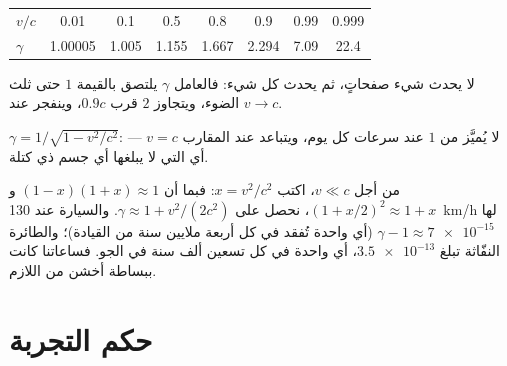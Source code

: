 \begin{example}\label{ex:g12:special-relativity:gammatable}
\begin{center}\small
\begin{tabular}{lccccccc}
$v/c$    & 0.01     & 0.1   & 0.5   & 0.8   & 0.9   & 0.99 & 0.999\\
$\gamma$ & 1.00005 & 1.005 & 1.155 & 1.667 & 2.294 & 7.09 & 22.4
\end{tabular}
\end{center}
لا يحدث شيء صفحاتٍ، ثم يحدث كل شيء: فالعامل $\gamma$ يلتصق بالقيمة $1$ حتى ثلث
 الضوء، ويتجاوز $2$ قرب $0.9c$، وينفجر عند $v \to c$.
\end{example}

\begin{omfigure}

{\small $\gamma = 1/\sqrt{1 - v^2/c^2}$: لا يُميَّز من $1$ عند سرعات
كل يوم، ويتباعد عند المقارب $v = c$ --- أي  التي لا يبلغها أي جسم ذي كتلة.}
\end{omfigure}

\begin{remark}\label{rem:g12:special-relativity:everyday}
من أجل $v \ll c$، اكتب $x = v^2/c^2$: فبما أن $(1-x)(1+x) \approx 1$ و
$(1 + x/2)^2 \approx 1 + x$، نحصل على $\gamma \approx 1 + v^2/(2c^2)$. والسيارة
عند \qty{130}{km/h} لها $\gamma - 1 \approx \num{7e-15}$ (أي  واحدة تُفقد
في كل أربعة ملايين سنة من القيادة)؛ والطائرة النفّاثة تبلغ $\num{3.5e-13}$، أي 
واحدة في كل تسعين ألف سنة في الجو. فساعاتنا كانت ببساطة أخشن من اللازم.
\end{remark}

\section{حكم التجربة}

